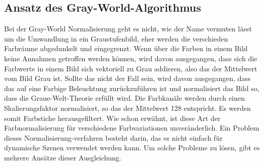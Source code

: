   \subsection{Ansatz des Gray-World-Algorithmus}\label{s.gw}
  Bei der Gray-World Normalisierung geht es nicht, wie der Name vermuten lässt um die Umwandlung in ein Graustufenbild, eher werden die verschieden Farbräume abgedunkelt und eingegrenzt. Wenn über die Farben in einem Bild keine Annahmen getroffen werden können, wird davon ausgegangen, dass sich die Farbwerte in einem Bild sich vektoriell zu Grau addieren, also das der Mittelwert vom Bild Grau ist. Sollte das nicht der Fall sein, wird davon ausgegangen, dass das auf eine Farbige Beleuchtung zurückzuführen ist und normalisiert das Bild so, dass die Graue-Welt-Theorie erfüllt wird. Die Farbkanäle werden durch einen Skalierungsfaktor normalisiert, so das der Mittelwert 128 entspricht. Es werden somit Farbstiche herausgefiltert. Wie schon erwähnt, ist diese Art der Farbnormalisierung für verschiedene Farbvariationen unveränderlich. Ein Problem dieses Normalisierung-verfahren besteht darin, das es nicht einfach für dynamische Szenen verwendet werden kann. Um solche Probleme zu lösen, gibt es mehrere Ansätze dieser Ausgleichung.
